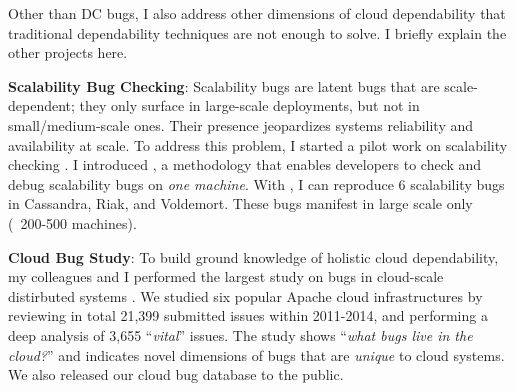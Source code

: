 \documentclass[11pt]{article}
\begin{document}
Other than DC bugs, I also address other dimensions of cloud dependability that
traditional dependability techniques are not enough to solve. I briefly explain
the other projects here.

%


\noindent
\textbf{Scalability Bug Checking}: Scalability bugs are latent bugs that are
scale-dependent; they only surface in large-scale deployments, but not in
small/medium-scale ones. Their presence jeopardizes systems reliability and
availability at scale. 
%
To address this problem, I started a pilot work on scalability checking
\cite{Gunawi+17-SCk-Insub,Leesatapornwongsa+17-SCk-InPrep}. I introduced \sck,
a methodology that enables developers to check and debug scalability bugs on
\textit{one machine}. With \sck, I can reproduce 6 scalability bugs in
Cassandra, Riak, and Voldemort.  These bugs manifest in large scale only (\eg\
200-500 machines). 


\noindent
\textbf{Cloud Bug Study}: To build ground knowledge of holistic cloud
dependability, my colleagues and I performed the largest study on bugs in
cloud-scale distirbuted systems \cite{Gunawi+14-Cbs}. We studied six popular
Apache cloud infrastructures by reviewing in total 21,399 submitted issues
within 2011-2014, and performing a deep analysis of 3,655 ``\textit{vital}''
issues. The study shows ``\textit{what bugs live in the cloud?}'' and indicates
novel dimensions of bugs that are \textit{unique} to cloud systems. We also
released our cloud bug database to the public.

\end{document}
